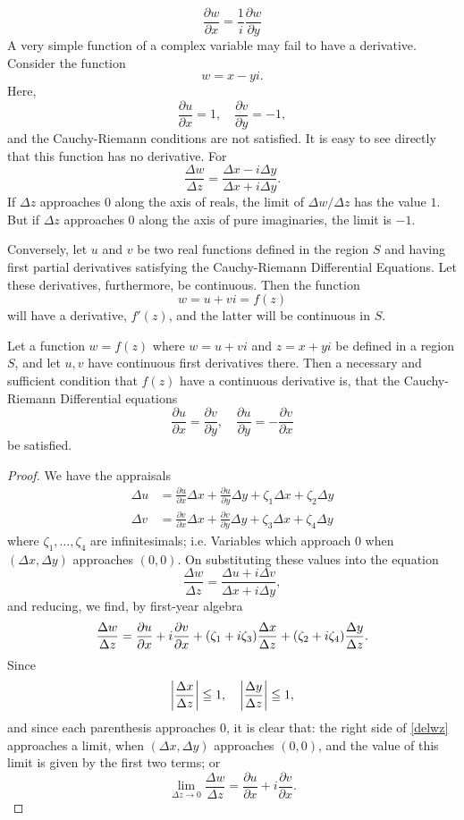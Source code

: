 \documentclass[twosided]{memoir}
\begin{document}
\begin{equation}\label{creq2}
\frac{\partial w}{\partial x} =\frac{1}{i}\frac{\partial w}{\partial y} 
\end{equation}
A very simple function of a complex variable may fail to have a derivative. Consider the function
\[
w=x-yi
.\] Here,
\[
\frac{\partial u}{\partial x} =1, \quad \frac{\partial v}{\partial y} =-1,
\] and the Cauchy-Riemann conditions are not satisfied. It is easy to see directly that this function has no derivative. For
\[
\frac{\Delta w}{\Delta z} =\frac{\Delta x-i\Delta y}{\Delta x+i\Delta y} 
.\] If $\Delta z$ approaches $0$ along the axis of reals, the limit of $\Delta w / \Delta z$ has the value $1$. But if $\Delta z$ approaches $0$ along the axis of pure imaginaries, the limit is $-1$. 

Conversely, let $u$ and $v$ be two real functions defined in the region $S$ and having first partial derivatives satisfying the Cauchy-Riemann Differential Equations. Let these derivatives, furthermore, be continuous. Then the function
\[
	w=u+vi=f(z)
\] will have a derivative, $f'(z)$, and the latter will be continuous in $S$. 
\begin{theorem}
	Let a function $w=f(z)$ where $w=u+vi$ and $z=x+yi$ be defined in a region $S$, and let $u, v$ have continuous first derivatives there. Then a necessary and sufficient condition that $f(z)$ have a continuous derivative is, that the Cauchy-Riemann Differential equations
	\[
	\frac{\partial u}{\partial x} =\frac{\partial v}{\partial y} , \quad \frac{\partial u}{\partial y} =-\frac{\partial v}{\partial x} 
	\] be satisfied. 
\end{theorem} 
\begin{proof}
We have the appraisals
\begin{align*}
	\Delta u&=\frac{\partial u}{\partial x} \Delta x+\frac{\partial u}{\partial y} \Delta y+\zeta_1\Delta x+\zeta_2\Delta y\\
	\Delta v&=\frac{\partial v}{\partial x} \Delta x+\frac{\partial v}{\partial y} \Delta y+\zeta_3\Delta x+\zeta_4 \Delta y
\end{align*} where $\zeta_1, \dots , \zeta_4$ are infinitesimals; i.e. Variables which approach $0$ when $(\Delta x, \Delta y)$ approaches $(0,0)$. On substituting these values into the equation
\[
\frac{\Delta w}{\Delta z} =\frac{\Delta u+i\Delta v}{\Delta x+i\Delta y} 
,\] and reducing, we find, by first-year algebra
\begin{equation}\label{delwz}
	\frac{\Delta w}{\Delta z} =\frac{\partial u}{\partial x} +i \frac{\partial v}{\partial x} +\pbr*{\zeta_1+i\zeta_3} \frac{\Delta x}{\Delta z} +\pbr*{\zeta_2+i\zeta_4} \frac{\Delta y}{\Delta z}.
\end{equation}
Since
\[
\abs*{\frac{\Delta x}{\Delta z} } \le 1, \quad \abs*{\frac{\Delta y}{\Delta z} } \le 1
,\] and since each parenthesis approaches $0$, it is clear that: the right side of \ref{delwz} approaches a limit, when $(\Delta x, \Delta y)$ approaches $(0,0)$, and the value of this limit is given by the first two terms; or
\[
\lim\limits_{\Delta z \to 0} \frac{\Delta w}{\Delta z} =\frac{\partial u}{\partial x} +i \frac{\partial v}{\partial x} 
.\] 
\end{proof} 
\end{document}
